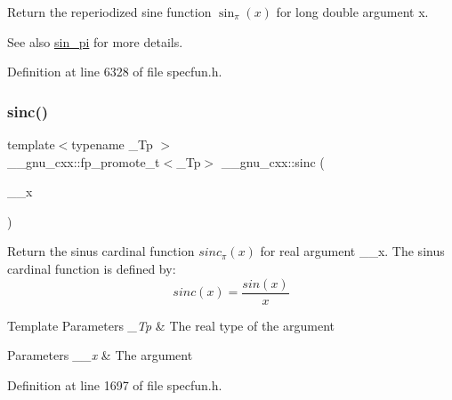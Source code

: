 Return the reperiodized sine function $ \sin_\pi(x) $ for {\ttfamily long double} argument {\ttfamily x}.

\begin{DoxySeeAlso}{See also}
\hyperlink{group__mathsf__gnu_ga220f8a9a0477697cff96e84dc911d5f0}{sin\+\_\+pi} for more details. 
\end{DoxySeeAlso}


Definition at line 6328 of file specfun.\+h.

\mbox{\label{group__mathsf__gnu_ga09976b5d041113979c93613cc3700348}} 
\subsubsection{\texorpdfstring{sinc()}{sinc()}}
{\footnotesize\ttfamily template$<$typename \+\_\+\+Tp $>$ \\
\+\_\+\+\_\+gnu\+\_\+cxx\+::fp\+\_\+promote\+\_\+t$<$\+\_\+\+Tp$>$ \+\_\+\+\_\+gnu\+\_\+cxx\+::sinc (\begin{DoxyParamCaption}\item[{\+\_\+\+Tp}]{\+\_\+\+\_\+x }\end{DoxyParamCaption})\hspace{0.3cm}{\ttfamily [inline]}}

Return the sinus cardinal function $ sinc_\pi(x) $ for real argument {\ttfamily \+\_\+\+\_\+x}. The sinus cardinal function is defined by\+: \[ sinc(x) = \frac{sin(x)}{x} \]


\begin{DoxyTemplParams}{Template Parameters}
{\em \+\_\+\+Tp} & The real type of the argument \\
\hline
\end{DoxyTemplParams}

\begin{DoxyParams}{Parameters}
{\em \+\_\+\+\_\+x} & The argument \\
\hline
\end{DoxyParams}


Definition at line 1697 of file specfun.\+h.

\mbox{\label{group__mathsf__gnu_ga5195270024403b985e7d4f2f935f8779}} 
